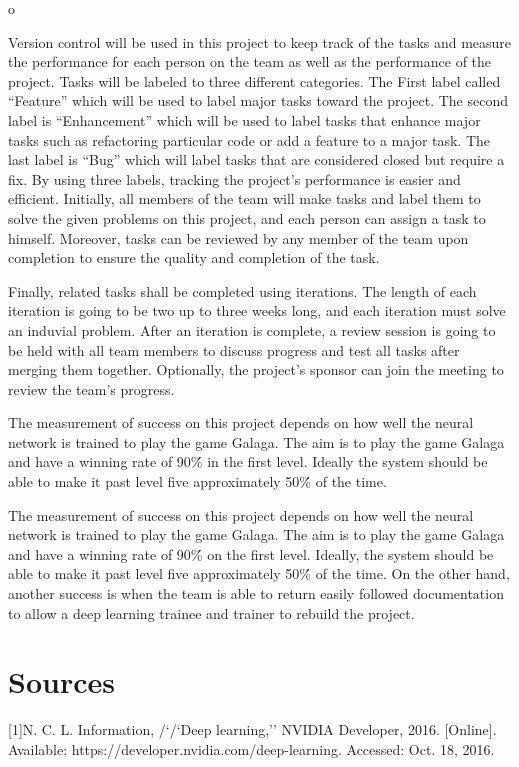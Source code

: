 o\documentclass[letterpaper,10pt]{article}
\begin{document}
Version control will be used in this project to keep track of the tasks and measure the performance for each person on the team as well as the performance of the project.
 Tasks will be labeled to three different categories.
 The First label called “Feature” which will be used to label major tasks toward the project.
 The second label is “Enhancement” which will be used to label tasks that enhance major tasks such as refactoring particular code or add a feature to a major task.
 The last label is “Bug” which will label tasks that are considered closed but require a fix.
 By using three labels, tracking the project’s performance is easier and efficient.
 Initially, all members of the team will make tasks and label them to solve the given problems on this project, and each person can assign a task to himself.
 Moreover, tasks can be reviewed by any member of the team upon completion to ensure the quality and completion of the task.


Finally, related tasks shall be completed using iterations.
 The length of each iteration is going to be two up to three weeks long, and each iteration must solve an induvial problem.
 After an iteration is complete, a review session is going to be held with all team members to discuss progress and test all tasks after merging them together.
 Optionally, the project’s sponsor can join the meeting to review the team's progress.

The measurement of success on this project depends on how well the neural network is trained to play the game Galaga.
The aim is to play the game Galaga and have a winning rate of 90\'\% in the first level.
Ideally the system should be able to make it past level five approximately 50\'\% of the time.

The measurement of success on this project depends on how well the neural network is trained to play the game Galaga. 
The aim is to play the game Galaga and have a winning rate of 90\'\% on the first level.
Ideally, the system should be able to make it past level five approximately 50\'\% of the time.
On the other hand, another success is when the team is able to return easily followed documentation to allow a deep learning trainee and trainer to rebuild the project.
\section{Sources}

[1]N. C. L. Information, /`/`Deep learning,'' NVIDIA Developer, 2016. [Online]. Available: https://developer.nvidia.com/deep-learning. Accessed: Oct. 18, 2016.
\end{document}
